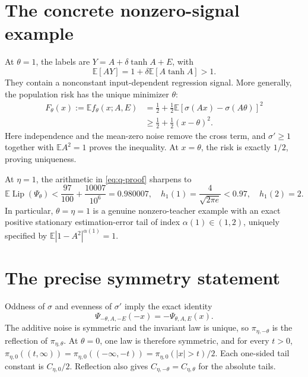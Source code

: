 \documentclass[11pt,a4paper]{article}
\numberwithin{equation}{section}
\theoremstyle{remark}
\DeclareMathOperator{\Lip}{Lip}
\newcommand{\E}{\mathbb E}
\begin{document}
\section{The concrete nonzero-signal example}\label{sec:signal}

At $\theta=1$, the labels are $Y=A+\delta\tanh A+E$, with
\begin{equation}
 \E[AY]=1+\delta\E[A\tanh A]>1.\label{eq:nonzero-signal}
\end{equation}
They contain a nonconstant input-dependent regression signal.
More generally, the population risk has the unique minimizer $\theta$:
\begin{align}
 F_\theta(x):=\E f_\theta(x;A,E)
 &=\frac12+\frac12\E[\sigma(Ax)-\sigma(A\theta)]^2\nonumber\\
 &\ge\frac12+\frac12(x-\theta)^2.\label{eq:risk}
\end{align}
Here independence and the mean-zero noise remove the cross term, and
$\sigma'\ge1$ together with $\E A^2=1$ proves the inequality.
At $x=\theta$, the risk is exactly $1/2$, proving uniqueness.

At $\eta=1$, the arithmetic in \eqref{eq:q-proof} sharpens to
\begin{equation}
 \E\Lip(\Psi_\theta)<\frac{97}{100}+\frac{10007}{10^6}
 =0.980007,
 \quad h_1(1)=\frac4{\sqrt{2\pi e}}<0.97,
 \quad h_1(2)=2.\label{eq:eta-one}
\end{equation}
In particular, $\theta=\eta=1$ is a genuine nonzero-teacher example
with an exact positive stationary estimation-error tail of index
$\alpha(1)\in(1,2)$, uniquely specified by $\E|1-A^2|^{\alpha(1)}=1$.

\section{The precise symmetry statement}\label{sec:symmetry}

Oddness of $\sigma$ and evenness of $\sigma'$ imply the exact identity
\begin{equation}
 \Psi_{-\theta,A,-E}(-x)=-\Psi_{\theta,A,E}(x).
 \label{eq:reflection}
\end{equation}
The additive noise is symmetric and the invariant law is unique, so
$\pi_{\eta,-\theta}$ is the reflection of $\pi_{\eta,\theta}$.
At $\theta=0$, one law is therefore symmetric, and for every $t>0$,
$\pi_{\eta,0}((t,\infty))=\pi_{\eta,0}((-\infty,-t))
=\pi_{\eta,0}(|x|>t)/2$. Each one-sided tail constant is
$C_{\eta,0}/2$. Reflection also gives
$C_{\eta,-\theta}=C_{\eta,\theta}$ for the absolute tails.
\end{document}
